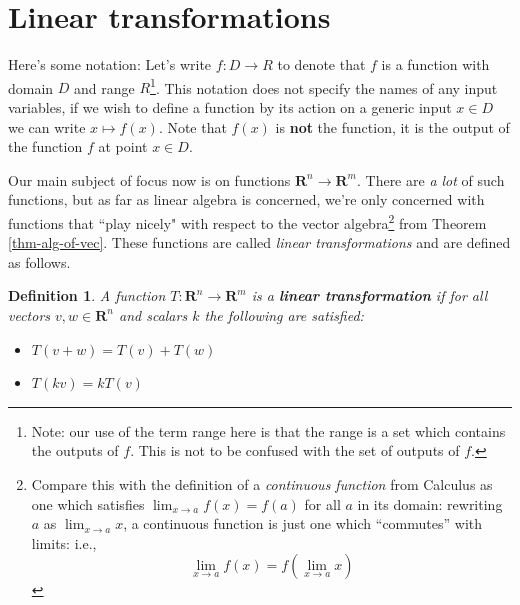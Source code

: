 \documentclass[12pt]{article}
\numberwithin{equation}{subsection}
\numberwithin{figure}{subsection}
\newtheorem{defn}[subsection]{Definition}
\theoremstyle{note}
\begin{document}
\section{Linear transformations}

Here's some notation: Let's write $f\colon D\to R$ to denote that $f$ is a function with domain $D$ and range $R$\footnote{Note: our use of the term range here is that the range is a set which contains the outputs of $f$. This is not to be confused with the set of outputs of $f$.}. This notation does not specify the names of any input variables, if we wish to define a function by its action on a generic input $x\in D$ we can write $x\mapsto f(x)$. Note that $f(x)$ is \textbf{not} the function, it is the output of the function $f$ at point $x\in D$. 


Our main subject of focus now is on functions $\mathbf{R}^n\to\mathbf{R}^m$. There are \textit{a lot} of such functions, but as far as linear algebra is concerned, we're only concerned with functions that ``play nicely" with respect to the vector algebra\footnote{Compare this with the definition of a \textit{continuous function} from Calculus as one which satisfies $\lim_{x\to a}f(x)=f(a)$ for all $a$ in its domain: rewriting $a$ as $\lim_{x\to a}x$, a continuous function is just one which ``commutes'' with limits: i.e., \[ \lim_{x\to a} f(x)=f\left( \lim_{x\to a} x\right)\]} from Theorem \ref{thm-alg-of-vec}. These functions are called \textit{linear transformations} and are defined as follows. 
\begin{defn}A function $T\colon \mathbf{R}^n\to \mathbf{R}^m$ is a \textbf{linear transformation} if for all vectors $v,w\in\mathbf{R}^n$ and scalars $k$ the following are satisfied:
\begin{itemize} 
	\item $T(v+w)=T(v)+T(w)$
	\item $T(k v)=k T(v)$ 
\end{itemize}
\end{defn}
\end{document}
